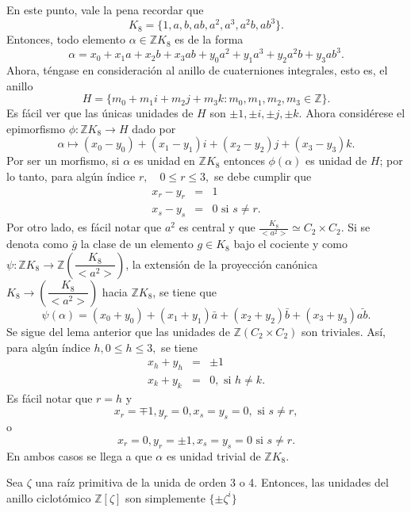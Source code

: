 \begin{proof*}
En este punto, vale la pena recordar que \[ K_8 = \{ 1,a,b,ab,a^2,a^3,a^2b,ab^3  \}.\] Entonces, todo elemento $\alpha \in \mathds{Z}K_8$ es de la forma \[ \alpha = x_0 + x_1a + x_2b + x_3ab + y_0a^2 + y_1a^3 + y_2a^2b + y_3ab^3.\] Ahora, téngase en consideración al anillo de cuaterniones integrales, esto es, el anillo \[ H = \{ m_0 + m_1i+ m_2j +m_3k \colon m_0, m_1, m_2, m_3 \in \mathds{Z} \}.\] Es fácil ver que las únicas unidades de $H$ son $\pm 1, \pm i, \pm j, \pm k.$ Ahora considérese el epimorfismo $\phi \colon \mathds{Z}K_8 \to H$ dado por \[ \alpha \mapsto (x_0 - y_0) + (x_1 - y_1)i + (x_2 - y_2)j +(x_3-y_3)k. \]
Por ser un morfismo, si $\alpha$ es unidad en $\mathds{Z}K_8$ entonces $\phi(\alpha)$ es unidad de $H$; por lo tanto, para algún índice $r, \quad 0 \leq r \leq 3,$ se debe cumplir que 
\begin{eqnarray*}
x_r - y_r &=&1 \\  
x_s - y_s &=& 0 \mbox{ si } s \neq r .
\end{eqnarray*}
Por otro lado, es fácil notar que $a^2$  es central y que $\frac{K_8}{<a^2>} \simeq C_2 \times C_2.$ Si se denota como $\bar{g}$ la clase de un elemento $g \in K_8$ bajo el cociente y como $\psi \colon \mathds{Z}K_8 \to \mathds{Z}\left(\dfrac{K_8}{<a^2>}\right)$, la extensión de la proyección canónica $K_8 \to \left( \dfrac{K_8}{<a^2>} \right)$ hacia $\mathds{Z}K_8$, se tiene que \[ \psi(\alpha) = (x_0 + y_0) +(x_1 + y_1) \bar{a} + (x_2 + y_2)\bar{b} + (x_3+y_3)\bar{ab}.\] Se sigue del lema anterior que las unidades de $\mathds{Z}(C_2\times C_2)$ son triviales. Así, para algún índice $h, 0\leq h \leq 3,$ se tiene 
 \begin{eqnarray*}
 x_h + y_h &=& \pm 1 \\
 x_k + y_k &=& 0, \mbox{ si } h \neq k.
 \end{eqnarray*}
 Es fácil notar que $r = h$ y \[ x_r = \mp 1, y_r =0, x_s = y_s =0, \mbox{ si } s \neq r, \] o 
 \[ x_r =0 , y_r = \pm 1, x_s = y_s = 0 \mbox{ si } s \neq r.  \] En ambos casos se llega a que $\alpha$ es unidad trivial de $\mathds{Z}K_8$.
\end{proof*}
\begin{lema}\label{lema:tercerLema}
Sea $\zeta$ una raíz primitiva de la unida de orden 3 o 4. Entonces, las unidades del anillo ciclotómico $\mathds{Z}[\zeta]$ son simplemente $\{\pm \zeta^{i} \}$
\end{lema}
